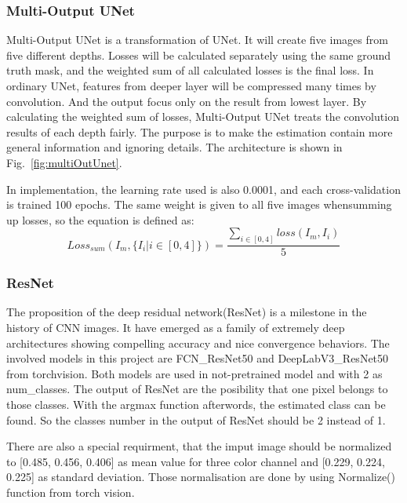 \documentclass[10pt,journal,compsoc]{IEEEtran}
\begin{document}
\subsubsection{Multi-Output UNet}
Multi-Output UNet is a transformation of UNet. 
It will create five images from five different depths.
Losses will be calculated separately using the same ground truth mask, and the weighted sum of all calculated losses is the final loss.
In ordinary UNet, features from deeper layer will be compressed many times by convolution. 
And the output focus only on the result from lowest layer.
By calculating the weighted sum of losses, Multi-Output UNet treats the convolution results of each depth fairly.
The purpose is to make the estimation contain more general information and ignoring details.
The architecture is shown in Fig.~\ref{fig:multiOutUnet}.
\par
In implementation, the learning rate used is also 0.0001, and each cross-validation is trained 100 epochs.
The same weight is given to all five images whensumming up losses, so the equation is defined as:
\begin{equation} Loss_{sum}(I_m, \{I_i|i\in [0, 4]\}) = \frac{\sum_{i\in [0, 4]}loss(I_m, I_i)}{5}  \end{equation}

\subsubsection{ResNet}
The proposition of the deep residual network(ResNet)\cite{hekaimingResNet} is a milestone in the history of CNN images.
It have emerged as a family of extremely deep architectures showing \linebreak compelling accuracy and nice convergence behaviors. 
The involved models in this project are FCN\_ResNet50\cite{longResNet} and DeepLabV3\_ResNet50\cite{chenResNet} from torchvision.
Both models are used in not-pretrained model and with 2 as num\_classes.
The output of ResNet are the posibility that one pixel \linebreak belongs to those classes. 
With the argmax function \linebreak afterwords, the estimated class can be found. 
So the classes number in the output of ResNet should be 2 instead of 1.
\par
There are also a special requirment, that the imput \linebreak image should be normalized to [0.485, 0.456, 0.406] as mean value for three color channel and [0.229, 0.224, 0.225] as standard deviation.
Those normalisation are done by using Normalize() function from torch vision.
\end{document}
